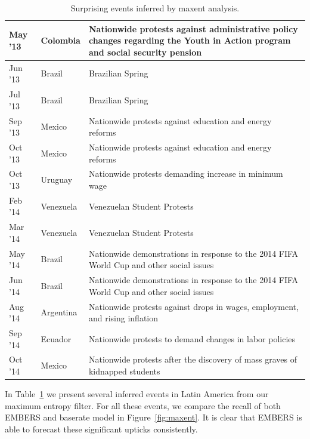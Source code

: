 \documentclass[11pt,a4paper,extrafontsizes,oneside]{article}
\begin{document}
\begin{table}
\caption{Surprising events inferred by maxent analysis.}
\renewcommand{\arraystretch}{1.1}
\vspace{-3mm}
 \centering
 \begin{tabular}{|l|l|m{5cm}|}
 \hline
May '13  &  Colombia	 &  Nationwide protests against administrative policy changes regarding the
Youth in Action program and social security pension \\ \hline
Jun '13  &  Brazil  &  Brazilian Spring \\ \hline
Jul '13  &  Brazil  &  Brazilian Spring \\ \hline
Sep '13  &  Mexico  &  Nationwide protests against education and energy reforms \\ \hline
Oct '13  &  Mexico  &  Nationwide protests against education and energy reforms \\ \hline
Oct '13  &  Uruguay  &  Nationwide protests demanding increase in minimum wage \\ \hline
Feb '14  &  Venezuela	  &  Venezuelan Student Protests \\ \hline
Mar '14  &  Venezuela  &  	Venezuelan Student Protests \\ \hline
May '14  &  Brazil  &  Nationwide demonstrations in response to the 2014 FIFA World Cup and other social issues \\ \hline
Jun '14  &  Brazil  &  Nationwide demonstrations in response to the 2014 FIFA World Cup and other social issues \\ \hline
Aug '14  &  Argentina	  &  Nationwide protests against drops in wages, employment, and rising inflation \\ \hline
Sep '14  &  Ecuador  &  Nationwide protests to demand changes in labor policies \\ \hline
Oct '14  &  Mexico  &  Nationwide protests after the discovery of mass graves of kidnapped students  \\ \hline
\end{tabular}
\label{tab:maxentEvents}
\end{table}

In Table~\ref{tab:maxentEvents} we present several inferred events in Latin America from our maximum entropy
filter.
For all these events, we compare the recall of both EMBERS and baserate model
in Figure~\ref{fig:maxent}.
It is clear that EMBERS is able to forecast these significant upticks consistently.
\end{document}
